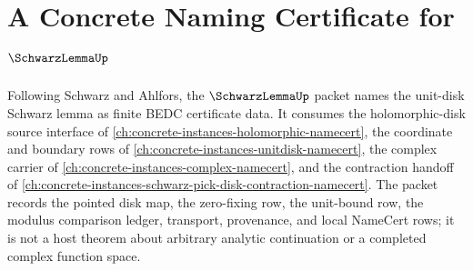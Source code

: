 \chapter{A Concrete Naming Certificate for $\SchwarzLemmaUp$}
\label{ch:concrete-instances-schwarz-lemma-namecert}

Following Schwarz and Ahlfors, the $\SchwarzLemmaUp$ packet names the unit-disk Schwarz lemma as finite BEDC certificate data. It consumes the holomorphic-disk source interface of \autoref{ch:concrete-instances-holomorphic-namecert}, the coordinate and boundary rows of \autoref{ch:concrete-instances-unitdisk-namecert}, the complex carrier of \autoref{ch:concrete-instances-complex-namecert}, and the contraction handoff of \autoref{ch:concrete-instances-schwarz-pick-disk-contraction-namecert}. The packet records the pointed disk map, the zero-fixing row, the unit-bound row, the modulus comparison ledger, transport, provenance, and local NameCert rows; it is not a host theorem about arbitrary analytic continuation or a completed complex function space.

